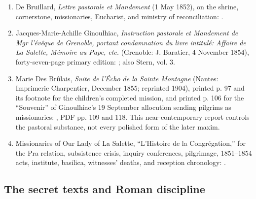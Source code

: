\begin{enumerate}
  \item De Bruillard, \emph{Lettre pastorale et Mandement} (1 May 1852), on the shrine, cornerstone, missionaries, Eucharist, and ministry of reconciliation: .
  \item Jacques-Marie-Achille Ginoulhiac, \emph{Instruction pastorale et Mandement de Mgr l'évêque de Grenoble, portant condamnation du livre intitulé: Affaire de La Salette, Mémoire au Pape, etc.} (Grenoble: J. Baratier, 4 November 1854), forty-seven-page primary edition: ; also Stern, vol. 3.
  \item Marie Des Brûlais, \emph{Suite de l'Écho de la Sainte Montagne} (Nantes: Imprimerie Charpentier, December 1855; reprinted 1904), printed p. 97 and its footnote for the children's completed mission, and printed p. 106 for the ``Souvenir'' of Ginoulhiac's 19 September allocution sending pilgrims as missionaries: , PDF pp. 109 and 118. This near-contemporary report controls the pastoral substance, not every polished form of the later maxim.
  \item Missionaries of Our Lady of La Salette, ``L'Histoire de la Congrégation,'' for the Pra relation, subsistence crisis, inquiry conferences, pilgrimage, 1851--1854 acts, institute, basilica, witnesses' deaths, and reception chronology: .
\end{enumerate}

\subsection{The secret texts and Roman discipline}

